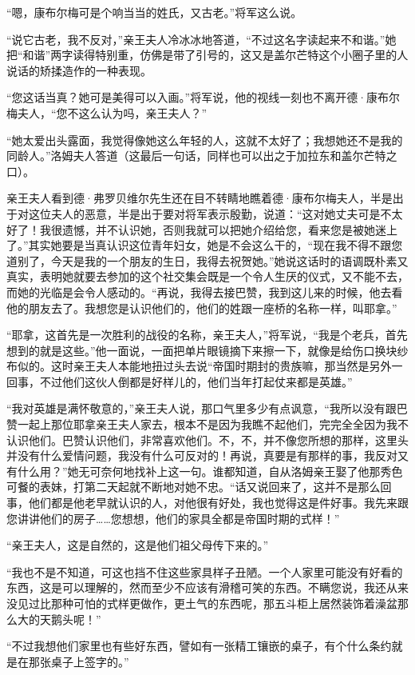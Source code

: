 \par “嗯，康布尔梅可是个响当当的姓氏，又古老。”将军这么说。
\par “说它古老，我不反对，”亲王夫人冷冰冰地答道，“不过这名字读起来不和谐。”她把“和谐”两字读得特别重，仿佛是带了引号的，这又是盖尔芒特这个小圈子里的人说话的矫揉造作的一种表现。
\par “您这话当真？她可是美得可以入画。”将军说，他的视线一刻也不离开德·康布尔梅夫人，“您不这么认为吗，亲王夫人？”
\par “她太爱出头露面，我觉得像她这么年轻的人，这就不太好了；我想她还不是我的同龄人。”洛姆夫人答道（这最后一句话，同样也可以出之于加拉东和盖尔芒特之口）。
\par 亲王夫人看到德·弗罗贝维尔先生还在目不转睛地瞧着德·康布尔梅夫人，半是出于对这位夫人的恶意，半是出于要对将军表示殷勤，说道：“这对她丈夫可是不太好了！我很遗憾，并不认识她，否则我就可以把她介绍给您，看来您是被她迷上了。”其实她要是当真认识这位青年妇女，她是不会这么干的，“现在我不得不跟您道别了，今天是我的一个朋友的生日，我得去祝贺她。”她说这话时的语调既朴素又真实，表明她就要去参加的这个社交集会既是一个令人生厌的仪式，又不能不去，而她的光临是会令人感动的。“再说，我得去接巴赞，我到这儿来的时候，他去看他的朋友去了。我想您是认识他们的，他们的姓跟一座桥的名称一样，叫耶拿。”
\par “耶拿，这首先是一次胜利的战役的名称，亲王夫人，”将军说，“我是个老兵，首先想到的就是这些。”他一面说，一面把单片眼镜摘下来擦一下，就像是给伤口换块纱布似的。这时亲王夫人本能地扭过头去说“帝国时期封的贵族嘛，那当然是另外一回事，不过他们这伙人倒都是好样儿的，他们当年打起仗来都是英雄。”
\par “我对英雄是满怀敬意的，”亲王夫人说，那口气里多少有点讽意，“我所以没有跟巴赞一起上那位耶拿亲王夫人家去，根本不是因为我瞧不起他们，完完全全因为我不认识他们。巴赞认识他们，非常喜欢他们。不，不，并不像您所想的那样，这里头并没有什么爱情问题，我没有什么可反对的！再说，真要是有那样的事，我反对又有什么用？”她无可奈何地找补上这一句。谁都知道，自从洛姆亲王娶了他那秀色可餐的表妹，打第二天起就不断地对她不忠。“话又说回来了，这并不是那么回事，他们都是他老早就认识的人，对他很有好处，我也觉得这是件好事。我先来跟您讲讲他们的房子……您想想，他们的家具全都是帝国时期的式样！”
\par “亲王夫人，这是自然的，这是他们祖父母传下来的。”
\par “我也不是不知道，可这也挡不住这些家具样子丑陋。一个人家里可能没有好看的东西，这是可以理解的，然而至少不应该有滑稽可笑的东西。不瞒您说，我还从来没见过比那种可怕的式样更做作，更土气的东西呢，那五斗柜上居然装饰着澡盆那么大的天鹅头呢！”
\par “不过我想他们家里也有些好东西，譬如有一张精工镶嵌的桌子，有个什么条约就是在那张桌子上签字的。”
